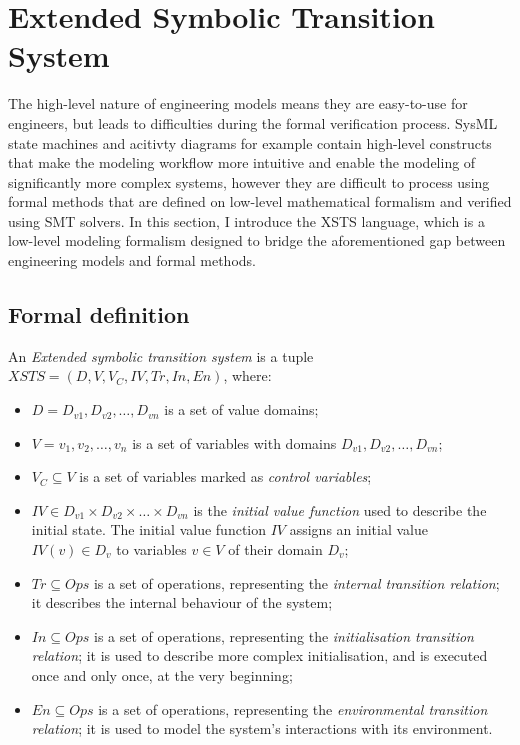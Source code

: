 \section{Extended Symbolic Transition System}\label{sec:xsts}

The high-level nature of engineering models means they are easy-to-use for engineers, but leads to difficulties during the formal verification process. SysML state machines and acitivty diagrams for example contain high-level  constructs that make the modeling workflow more intuitive and enable the modeling of significantly more complex systems, however they are difficult to process using formal methods that are defined on low-level mathematical formalism and verified using SMT solvers. In this section, I introduce the XSTS\cite{xsts} language, which is a low-level modeling formalism designed to bridge the aforementioned gap between engineering models and formal methods.

\subsection{Formal definition}

\begin{definition}
	
	An \emph{Extended symbolic transition system} is a tuple \( XSTS = (D, V, V_C, IV, Tr, In, En) \), where:
	
	\begin{itemize}
		\item \(D = {D_{v1}, D_{v2}, \dots, D_{vn}}\) is a set of value domains;
		\item \(V = {v_1, v_2, \dots, v_n}\) is a set of variables with domains \(D_{v1}, D_{v2}, \dots, D_{vn}\);
		\item \(V_C \subseteq V\) is a set of variables marked as \emph{control variables};
		\item \(IV \in D_{v1} \times D_{v2} \times \dots \times D_{vn}\) is the \emph{initial value function} used to describe the initial state. The initial value function \(IV\) assigns an initial value \(IV(v) \in D_v\) to variables \(v \in V\) of their domain \(D_v\);
		\item \(Tr \subseteq Ops\) is a set of operations, representing the \emph{internal transition relation}; it describes the internal behaviour of the system;
		\item \(In \subseteq Ops\) is a set of operations, representing the \emph{initialisation transition relation}; it is used to describe more complex initialisation, and is executed once and only once, at the very beginning;
		\item \(En \subseteq Ops\) is a set of operations, representing the \emph{environmental transition relation}; it is used to model the system's interactions with its environment.
	\end{itemize}
\end{definition}\label{def:xsts}

